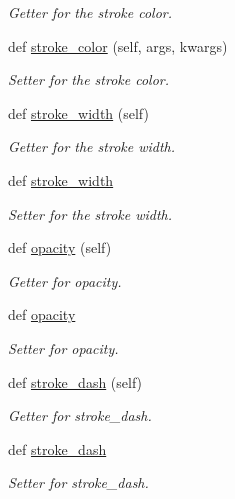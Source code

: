 \begin{DoxyCompactItemize}
\begin{DoxyCompactList}\small\item\em Getter for the stroke color. \end{DoxyCompactList}\item 
def \hyperlink{classbridges_1_1symbol_1_1_symbol_a4b90f8a3ebbf1bd8586d970e796a2401}{stroke\+\_\+color} (self, args, kwargs)
\begin{DoxyCompactList}\small\item\em Setter for the stroke color. \end{DoxyCompactList}\item 
def \hyperlink{classbridges_1_1symbol_1_1_symbol_a4da625974fcb3ac83a60489a7c059c10}{stroke\+\_\+width} (self)
\begin{DoxyCompactList}\small\item\em Getter for the stroke width. \end{DoxyCompactList}\item 
def \hyperlink{classbridges_1_1symbol_1_1_symbol_a85c961221005786cd8f5b31fec3fd8d2}{stroke\+\_\+width}
\begin{DoxyCompactList}\small\item\em Setter for the stroke width. \end{DoxyCompactList}\item 
def \hyperlink{classbridges_1_1symbol_1_1_symbol_a332e9461ed001268a100af2ad5a535e9}{opacity} (self)
\begin{DoxyCompactList}\small\item\em Getter for opacity. \end{DoxyCompactList}\item 
def \hyperlink{classbridges_1_1symbol_1_1_symbol_afea86f6d7c341168810c09159780ea83}{opacity}
\begin{DoxyCompactList}\small\item\em Setter for opacity. \end{DoxyCompactList}\item 
def \hyperlink{classbridges_1_1symbol_1_1_symbol_aeb388cf5a368e58ea10ecdd2ad7d3c10}{stroke\+\_\+dash} (self)
\begin{DoxyCompactList}\small\item\em Getter for stroke\+\_\+dash. \end{DoxyCompactList}\item 
def \hyperlink{classbridges_1_1symbol_1_1_symbol_a1163b25841477c2fda6368fc05f4f79d}{stroke\+\_\+dash}
\begin{DoxyCompactList}\small\item\em Setter for stroke\+\_\+dash. \end{DoxyCompactList}\item 

\end{DoxyCompactItemize}
